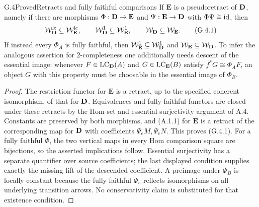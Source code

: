 \begin{claim}{G.4}{Proved}{Retracts and fully faithful comparisons}
If $\mathbf E$ is a pseudoretract of $\mathbf D$, namely if there are
morphisms $\Phi:\mathbf D\to\mathbf E$ and $\Psi:\mathbf E\to\mathbf D$
with $\Phi\Psi\cong\mathrm{id}$, then
\[
 \mathcal W_\mathbf D^{\mathrm{lc}}\subseteq\mathcal W_{\mathbf E}^{\mathrm{lc}},
 \qquad \mathcal W_\mathbf D^1\subseteq\mathcal W_{\mathbf E}^1,
 \qquad \mathcal W_\mathbf D\subseteq\mathcal W_{\mathbf E}.
 \tag{G.4.1}
\]
If instead every $\Phi_A$ is fully faithful, then
$\mathcal W_{\mathbf E}^1\subseteq\mathcal W_\mathbf D^1$ and
$\mathcal W_{\mathbf E}\subseteq\mathcal W_\mathbf D$. To infer the analogous assertion
for $2$-completeness one additionally needs descent of the essential
image: whenever $F\in\operatorname{LC}_\mathbf D(A)$ and
$G\in\operatorname{LC}_{\mathbf E}(B)$ satisfy
$f^*G\cong\Phi_A F$, an object $G$ with this property must be
choosable in the essential image of $\Phi_B$.
\end{claim}
\begin{proof}
The restriction functor for $\mathbf E$ is a retract, up to the
specified coherent isomorphism, of that for $\mathbf D$. Equivalences
and fully faithful functors are closed under these retracts by the
Hom-set and essential-surjectivity argument of A.4. Constants are
preserved by both morphisms, and (A.1.1) for $\mathbf E$ is a
retract of the corresponding map for $\mathbf D$ with coefficients
$\Psi_eM,\Psi_eN$. This proves (G.4.1).
For a fully faithful $\Phi$, the two vertical maps in every Hom
comparison square are bijections, so the asserted implications
follow. Essential surjectivity has a separate quantifier over
source coefficients; the last displayed condition supplies exactly
the missing lift of the descended coefficient. A preimage under
$\Phi_B$ is locally constant because the fully faithful $\Phi_e$
reflects isomorphisms on all underlying transition arrows. No conservativity
claim is substituted for that existence condition.
\end{proof}

